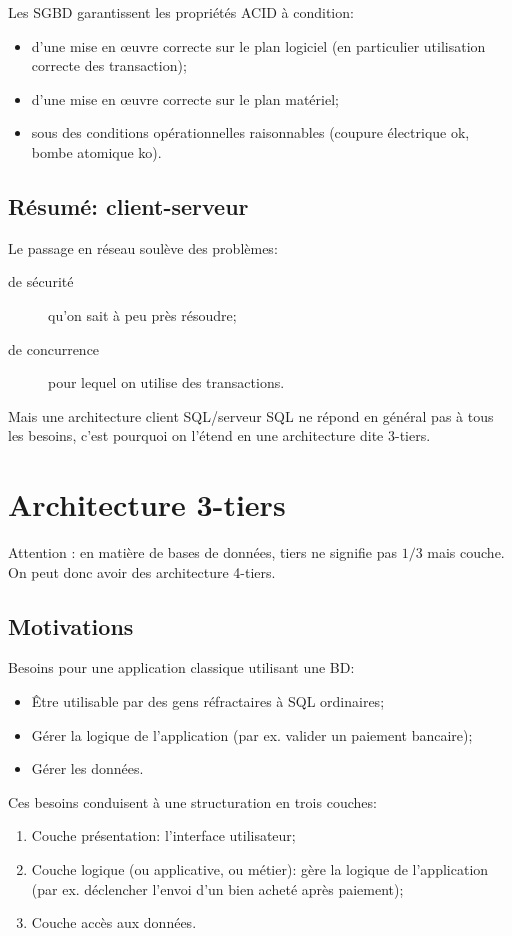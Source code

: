 Les SGBD garantissent les propriétés ACID à condition:
\begin{itemize}
\item d'une mise en \oe{}uvre correcte sur le plan logiciel (en
  particulier utilisation correcte des transaction);
\item d'une mise en \oe{}uvre correcte sur le plan matériel;
\item sous des conditions opérationnelles raisonnables (coupure
  électrique ok, bombe atomique ko).
\end{itemize}

\subsection{Résumé: client-serveur}
Le passage en réseau soulève des problèmes:
\begin{description}
\item[de sécurité] qu'on sait à peu près résoudre;
\item[de concurrence] pour lequel on utilise des transactions.
\end{description}

Mais une architecture client SQL/serveur SQL ne répond en général pas à tous les
besoins, c'est pourquoi on l'étend en une architecture dite 3-tiers.

\section{Architecture 3-tiers}

Attention : en matière de bases de données, \og{}tiers\fg{} ne signifie
pas $1/3$ mais \og{}couche\fg{}.
On peut donc avoir des architecture 4-tiers.

\subsection{Motivations}
Besoins pour une application classique utilisant une BD:
\begin{itemize}
\item Être utilisable par des gens réfractaires à SQL ordinaires;
\item Gérer la logique de l'application (par ex.
  valider un paiement bancaire);
\item Gérer les données.
\end{itemize}

Ces besoins conduisent à une structuration en trois couches:
\begin{enumerate}
\item Couche présentation: l'interface utilisateur;
\item Couche logique (ou applicative, ou métier): gère la logique de
  l'application (par ex. déclencher l'envoi d'un bien acheté
  après paiement);
\item Couche accès aux données.
\end{enumerate}


